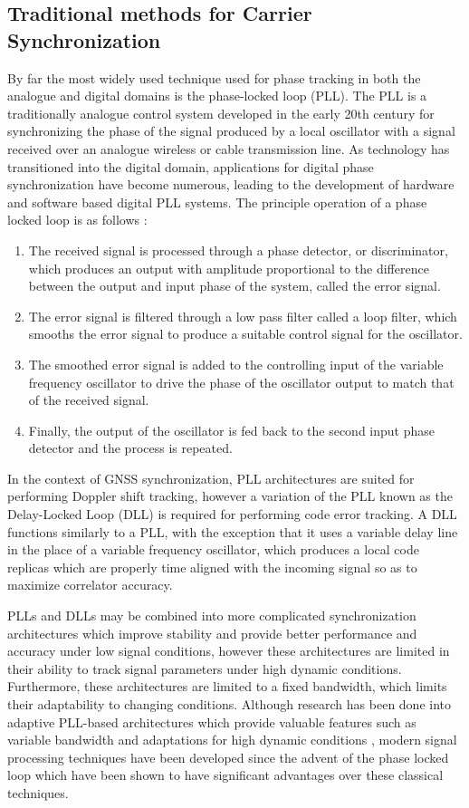 \documentclass[11pt]{article}
\begin{document}
\subsection{Traditional methods for Carrier Synchronization}

By far the most widely used technique used for phase tracking in both the analogue and digital domains is the phase-locked loop (PLL). The PLL is a traditionally analogue control system developed in the early 20th century for synchronizing the phase of the signal produced by a local oscillator with a signal received over an analogue wireless or cable transmission line. As technology has transitioned into the digital domain, applications for digital phase synchronization have become numerous, leading to the development of hardware and software based digital PLL systems. The principle operation of a phase locked loop is as follows \cite{Best-07}:

\begin{enumerate}
  \item The received signal is processed through a phase detector, or discriminator, which produces an output with amplitude proportional to the difference between the output and input phase of the system, called the error signal.
  \item The error signal is filtered through a low pass filter called a loop filter, which smooths the error signal to produce a suitable control signal for the oscillator.
  \item The smoothed error signal is added to the controlling input of the variable frequency oscillator to drive the phase of the oscillator output to match that of the received signal.
  \item Finally, the output of the oscillator is fed back to the second input phase detector and the process is repeated.
\end{enumerate}

In the context of GNSS synchronization, PLL architectures are suited for performing Doppler shift tracking, however a variation of the PLL known as the Delay-Locked Loop (DLL) is required for performing code error tracking. A DLL functions similarly to a PLL, with the exception that it uses a variable delay line in the place of a variable frequency oscillator, which produces a local code replicas which are properly time aligned with the incoming signal so as to maximize correlator accuracy.

PLLs and DLLs may be combined into more complicated synchronization architectures which improve stability and provide better performance and accuracy under low signal conditions, however these architectures are limited in their ability to track signal parameters under high dynamic conditions. Furthermore, these architectures are limited to a fixed bandwidth, which limits their adaptability to changing conditions. Although research has been done into adaptive PLL-based architectures which provide valuable features such as variable bandwidth and adaptations for high dynamic conditions \cite{Fant-12}\cite{Ward-98}\cite{Leg00}, modern signal processing techniques have been developed since the advent of the phase locked loop which have been shown to have significant advantages over these classical techniques.
\end{document}

